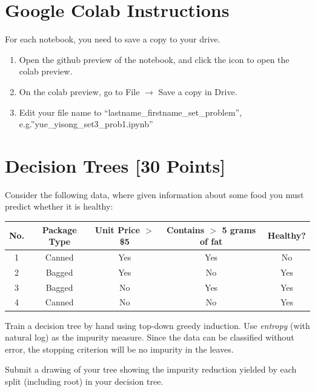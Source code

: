 \documentclass{article}
\begin{document}
\section*{Google Colab Instructions}
For each notebook, you need to save a copy to your drive.
\begin{enumerate}
        \item Open the github preview of the notebook, and click the icon to open the colab preview.
        \item On the colab preview, go to File $\rightarrow$ Save a copy in Drive.
        \item Edit your file name to “lastname_firstname_set_problem”, e.g.”yue_yisong_set3_prob1.ipynb”
\end{enumerate}




\newpage
\section{Decision Trees [30 Points]}

\problem[7]
Consider the following data, where given information about some food you must predict whether it is healthy:

\begin{table}[ht]
\centering
\begin{tabular}{c | c c c | c}
\hline
No. & Package Type & Unit Price $>$ \$5 & Contains $>$ 5 grams of fat & Healthy? \\ [0.5ex]
\hline
1 & Canned & Yes & Yes & No  \\
2 & Bagged & Yes & No  & Yes \\
3 & Bagged & No  & Yes & Yes \\
4 & Canned & No  & No  & Yes \\ [1ex]
\hline
\end{tabular}
\end{table}

Train a decision tree by hand using top-down greedy induction. Use \emph{entropy} (with natural log) as the impurity measure.  Since the data can be classified
without error, the stopping criterion will be no impurity in the leaves.

Submit a drawing of your tree showing the impurity reduction yielded by each split (including root) in your decision tree.
\end{document}
